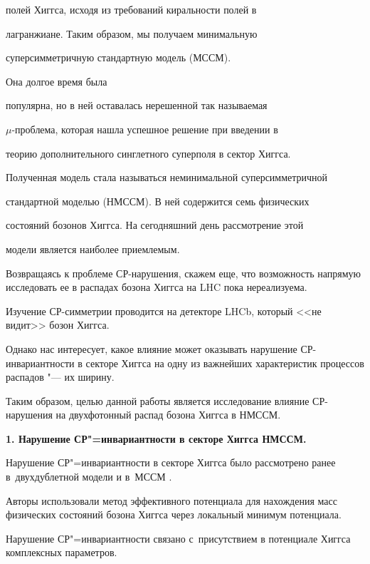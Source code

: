 полей Хиггса, исходя из требований киральности полей в

лагранжиане. Таким образом, мы получаем  минимальную

суперсимметричную стандартную модель (МССМ). 

Она долгое время была

популярна, но в ней оставалась нерешенной так называемая

$\mu$-проблема, которая нашла успешное решение при введении в

теорию дополнительного синглетного суперполя в сектор Хиггса.

Полученная модель стала называться неминимальной суперсимметричной

стандартной моделью (НМССМ). В ней содержится семь физических

состояний бозонов Хиггса. На сегодняшний день рассмотрение этой

модели является наиболее приемлемым.



Возвращаясь к проблеме СР-нарушения, скажем еще, что возможность напрямую исследовать ее в распадах бозона Хиггса на LHC пока нереализуема. 

Изучение СР-симметрии проводится на детекторе LHCb, который <<не видит>> бозон Хиггса. 

Однако нас интересует, какое влияние может оказывать нарушение СР-инвариантности в секторе Хиггса на одну из важнейших характеристик процессов распадов "--- их ширину. 

Таким образом, целью данной работы является исследование влияние СР-нарушения на двухфотонный распад бозона Хиггса в НМССМ.









\textbf{1. Нарушение СР"=инвариантности в секторе Хиггса НМССМ.}

Нарушение СР"=инвариантности в секторе Хиггса было рассмотрено ранее в~двухдублетной модели \cite{gurskaya:bib:Axmetzyanova} и в~МССМ \cite{gurskaya:bib:Axmetzyanova2, gurskaya:bib:Axmetzyanova3}. 

Авторы использовали метод эффективного потенциала для нахождения масс физических состояний бозона Хиггса через локальный минимум потенциала. 

Нарушение СР"=инвариантности связано с~присутствием в потенциале Хиггса комплексных параметров. 

